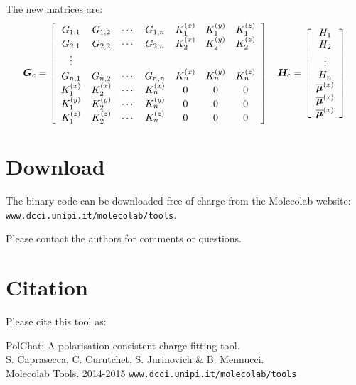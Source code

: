 \documentclass[a4paper]{report}
\newcommand{\bs}{\boldsymbol}
\newcommand{\mr}{\mathrm}
\begin{document}
The new matrices are:
\begin{equation}
\bs{G}_c = \left[ \begin{array}{ccccccccr} 
G_{1,1}   & G_{1,2}   & \cdots & G_{1,n}   & K_1^{(x)} & K_1^{(y)} & K_1^{(z)} \\
G_{2,1}   & G_{2,2}   & \cdots & G_{2,n}   & K_2^{(x)} & K_2^{(y)} & K_2^{(z)} \\
\vdots \\
G_{n,1}   & G_{n,2}   & \cdots & G_{n,n}   & K_n^{(x)} & K_n^{(y)} & K_n^{(z)} \\
K_1^{(x)} & K_2^{(x)} & \cdots & K_n^{(x)} & 0         & 0         & 0         \\
K_1^{(y)} & K_2^{(y)} & \cdots & K_n^{(y)} & 0         & 0         & 0         \\
K_1^{(z)} & K_2^{(z)} & \cdots & K_n^{(z)} & 0         & 0         & 0         \\
\end{array} \right] \hspace{0.3cm} \bs{H}_\mr{c} = \left[ \begin{array}{c} H_1 \\ H_2
\\ \vdots \\ H_n \\ \overline{\bs{\mu}}^{(x)} \\
\overline{\bs{\mu}}^{(x)} \\ \overline{\bs{\mu}}^{(x)} \end{array}
\right]
\end{equation}

\section*{Download}

The binary code can be downloaded free of charge from the Molecolab website:
\texttt{www.dcci.unipi.it/molecolab/tools}.

Please contact the authors for comments or questions.

\section*{Citation}

Please cite this tool as: 

\indent PolChat: A polarisation-consistent charge fitting tool. \\
\indent S. Caprasecca, C. Curutchet, S. Jurinovich \& B. Mennucci. \\
\indent Molecolab Tools. 2014-2015 \texttt{www.dcci.unipi.it/molecolab/tools}
\end{document}
